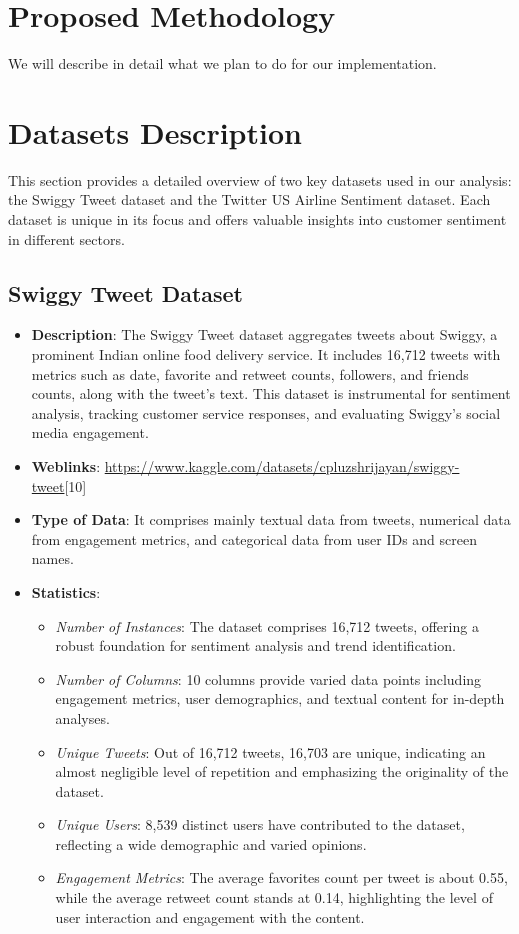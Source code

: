 \documentclass[conference]{IEEEtran}
\begin{document}
\section{Proposed Methodology}
We will describe in detail what we plan to do for our implementation. 

\section{Datasets Description}
This section provides a detailed overview of two key datasets used in our analysis: the Swiggy Tweet dataset and the Twitter US Airline Sentiment dataset. Each dataset is unique in its focus and offers valuable insights into customer sentiment in different sectors.

\subsection{Swiggy Tweet Dataset}
\begin{itemize}
    \item \textbf{Description}: The Swiggy Tweet dataset aggregates tweets about Swiggy, a prominent Indian online food delivery service. It includes 16,712 tweets with metrics such as date, favorite and retweet counts, followers, and friends counts, along with the tweet's text. This dataset is instrumental for sentiment analysis, tracking customer service responses, and evaluating Swiggy's social media engagement.
    
    \item \textbf{Weblinks}: \url{https://www.kaggle.com/datasets/cpluzshrijayan/swiggy-tweet}[10]
    
    \item \textbf{Type of Data}: It comprises mainly textual data from tweets, numerical data from engagement metrics, and categorical data from user IDs and screen names.
    
    \item \textbf{Statistics}:
    \begin{itemize}
        \item \textit{Number of Instances}: The dataset comprises 16,712 tweets, offering a robust foundation for sentiment analysis and trend identification.
        \item \textit{Number of Columns}: 10 columns provide varied data points including engagement metrics, user demographics, and textual content for in-depth analyses.
        \item \textit{Unique Tweets}: Out of 16,712 tweets, 16,703 are unique, indicating an almost negligible level of repetition and emphasizing the originality of the dataset.
        \item \textit{Unique Users}: 8,539 distinct users have contributed to the dataset, reflecting a wide demographic and varied opinions.
        \item \textit{Engagement Metrics}: The average favorites count per tweet is about 0.55, while the average retweet count stands at 0.14, highlighting the level of user interaction and engagement with the content.
    \end{itemize}
\end{itemize}
\end{document}
